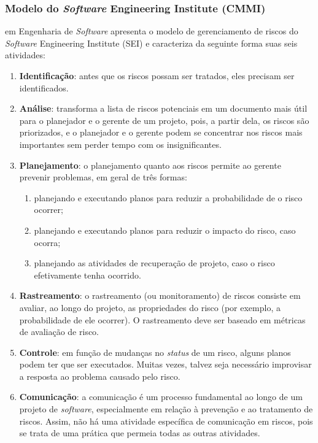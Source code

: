 \documentclass[
	12pt,
	openright,
	twoside,
	a4paper,
	english,
	brazil
	]{abntex2}
\begin{document}

\subsubsection{Modelo do \textit{Software} Engineering Institute (CMMI)}

 em Engenharia de \textit{Software} apresenta o modelo de gerenciamento de riscos do \textit{Software} Engineering Institute (SEI) e caracteriza da seguinte forma suas seis atividades:

\begin{enumerate}
  \item \textbf{Identificação}: antes que os riscos possam ser tratados, eles precisam ser identificados.
  \item \textbf{Análise}: transforma a lista de riscos potenciais em um documento mais útil para o planejador e o gerente de um projeto, pois, a partir dela, os riscos são priorizados, e o planejador e o gerente podem se concentrar nos riscos mais importantes sem perder tempo com os insignificantes.
  \item \textbf{Planejamento}: o planejamento quanto aos riscos permite ao gerente prevenir problemas, em geral de três formas:
  \begin{enumerate}
    \item planejando e executando planos para reduzir a probabilidade de o risco ocorrer;
    \item planejando e executando planos para reduzir o impacto do risco, caso ocorra;
    \item planejando as atividades de recuperação de projeto, caso o risco efetivamente tenha ocorrido.
  \end{enumerate}
  \item \textbf{Rastreamento}: o rastreamento (ou monitoramento) de riscos consiste em avaliar, ao longo do projeto, as propriedades do risco (por exemplo, a probabilidade de ele ocorrer). O rastreamento deve ser baseado em métricas de avaliação de risco.
  \item \textbf{Controle}: em função de mudanças no \textit{status} de um risco, alguns planos podem ter que ser executados. Muitas vezes, talvez seja necessário improvisar a resposta ao problema causado pelo risco.
  \item \textbf{Comunicação}: a comunicação é um processo fundamental ao longo de um projeto de \textit{software}, especialmente em relação à prevenção e ao tratamento de riscos. Assim, não há uma atividade específica de comunicação em riscos, pois se trata de uma prática que permeia todas as outras atividades.
\end{enumerate}
\end{document}
